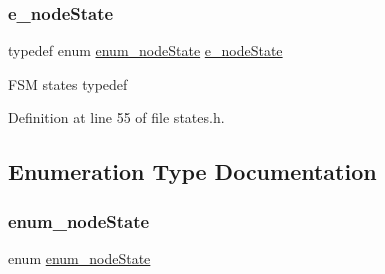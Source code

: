 \subsubsection{\texorpdfstring{e\+\_\+node\+State}{e\_nodeState}}
{\footnotesize\ttfamily typedef enum \mbox{\hyperlink{group___c_a_nopen___f_s_m__module_ga3136d2815abe9d284f985e0a7ec68646}{enum\+\_\+node\+State}} \mbox{\hyperlink{group___c_a_nopen___f_s_m__module_ga5891f63a4c9243179838389a93d084e2}{e\+\_\+node\+State}}}

F\+SM states typedef 

Definition at line 55 of file states.\+h.



\subsection{Enumeration Type Documentation}
\mbox{\label{group___c_a_nopen___f_s_m__module_ga3136d2815abe9d284f985e0a7ec68646}} 
\subsubsection{\texorpdfstring{enum\+\_\+node\+State}{enum\_nodeState}}
{\footnotesize\ttfamily enum \mbox{\hyperlink{group___c_a_nopen___f_s_m__module_ga3136d2815abe9d284f985e0a7ec68646}{enum\+\_\+node\+State}}}

